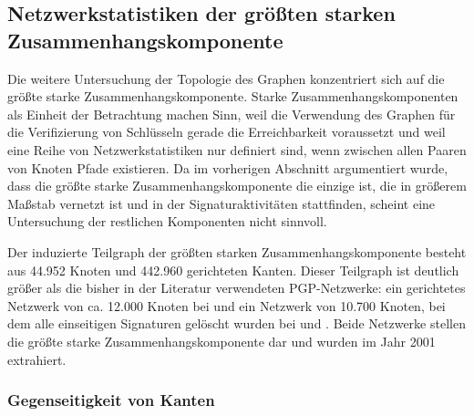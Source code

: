\subsection{Netzwerkstatistiken der größten starken
  Zusammenhangskomponente}
\label{sec:kennz-des-graph}

Die weitere Untersuchung der Topologie des Graphen konzentriert sich
auf die größte starke Zusammenhangskomponente. Starke
Zusammenhangskomponenten als Einheit der Betrachtung machen Sinn, weil
die Verwendung des Graphen für die Verifizierung von Schlüsseln
gerade die Erreichbarkeit voraussetzt und weil eine Reihe von
Netzwerkstatistiken nur definiert sind, wenn zwischen allen Paaren von
Knoten Pfade existieren. Da im vorherigen Abschnitt argumentiert
wurde, dass die größte starke Zusammenhangskomponente die einzige
ist, die in größerem Maßstab vernetzt ist und in der
Signaturaktivitäten stattfinden, scheint eine Untersuchung der
restlichen Komponenten nicht sinnvoll.

Der induzierte Teilgraph der größten starken
Zusammenhangskomponente besteht aus 44.952 Knoten und 442.960
gerichteten Kanten. Dieser Teilgraph ist deutlich größer als die
bisher in der Literatur verwendeten PGP-Netzwerke:  ein gerichtetes
Netzwerk von ca. 12.000 Knoten bei \cite{Capkun2002} und ein Netzwerk
von 10.700 Knoten, bei dem alle einseitigen Signaturen gelöscht
wurden bei \cite{Boguna2004} und \cite{Gregory2010}. Beide Netzwerke
stellen die größte starke Zusammenhangskomponente dar und wurden im
Jahr 2001 extrahiert.

\subsubsection{Gegenseitigkeit von Kanten}
\label{sec:gegens-von-kant}

